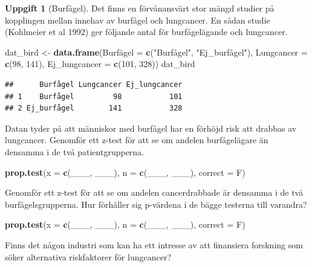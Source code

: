 \documentclass[
]{book}
\newenvironment{Shaded}{\begin{snugshade}}{\end{snugshade}}
\newcommand{\AttributeTok}[1]{\textcolor[rgb]{0.13,0.29,0.53}{#1}}
\newcommand{\DecValTok}[1]{\textcolor[rgb]{0.00,0.00,0.81}{#1}}
\newcommand{\FunctionTok}[1]{\textcolor[rgb]{0.13,0.29,0.53}{\textbf{#1}}}
\newcommand{\NormalTok}[1]{#1}
\newcommand{\OtherTok}[1]{\textcolor[rgb]{0.56,0.35,0.01}{#1}}
\newcommand{\StringTok}[1]{\textcolor[rgb]{0.31,0.60,0.02}{#1}}
\theoremstyle{definition}
\theoremstyle{definition}
\theoremstyle{definition}
\newtheorem{exercise}{Uppgift}[chapter]
\theoremstyle{definition}
\theoremstyle{remark}
\begin{document}
\begin{exercise}[Burfågel]
Det finns en förvånansvärt stor mängd studier på kopplingen mellan innehav av burfågel och lungcancer. En sådan studie (Kohlmeier et al 1992) ger följande antal för burfågelägande och lungcancer.

\begin{Shaded}
\begin{Highlighting}[]
\NormalTok{dat\_bird }\OtherTok{\textless{}{-}} \FunctionTok{data.frame}\NormalTok{(Burfågel }\OtherTok{=} \FunctionTok{c}\NormalTok{(}\StringTok{"Burfågel"}\NormalTok{, }\StringTok{"Ej\_burfågel"}\NormalTok{),}
              \AttributeTok{Lungcancer =} \FunctionTok{c}\NormalTok{(}\DecValTok{98}\NormalTok{, }\DecValTok{141}\NormalTok{),}
              \AttributeTok{Ej\_lungcancer =} \FunctionTok{c}\NormalTok{(}\DecValTok{101}\NormalTok{, }\DecValTok{328}\NormalTok{))}
\NormalTok{dat\_bird}
\end{Highlighting}
\end{Shaded}

\begin{verbatim}
##      Burfågel Lungcancer Ej_lungcancer
## 1    Burfågel         98           101
## 2 Ej_burfågel        141           328
\end{verbatim}

Datan tyder på att människor med burfågel har en förhöjd risk att drabbas av lungcancer. Genomför ett z-test för att se om andelen burfågelägare än densamma i de två patientgrupperna.

\begin{Shaded}
\begin{Highlighting}[]
\FunctionTok{prop.test}\NormalTok{(}\AttributeTok{x =} \FunctionTok{c}\NormalTok{(\_\_\_, \_\_\_), }\AttributeTok{n =} \FunctionTok{c}\NormalTok{(\_\_\_, \_\_\_), }\AttributeTok{correct =}\NormalTok{ F)}
\end{Highlighting}
\end{Shaded}

Genomför ett z-test för att se om andelen cancerdrabbade är densamma i de två burfågelsgrupperna. Hur förhåller sig p-värdena i de bägge testerna till varandra?

\begin{Shaded}
\begin{Highlighting}[]
\FunctionTok{prop.test}\NormalTok{(}\AttributeTok{x =} \FunctionTok{c}\NormalTok{(\_\_\_, \_\_\_), }\AttributeTok{n =} \FunctionTok{c}\NormalTok{(\_\_\_, \_\_\_), }\AttributeTok{correct =}\NormalTok{ F)}
\end{Highlighting}
\end{Shaded}

Finns det någon industri som kan ha ett intresse av att finansiera forskning som söker alternativa riskfaktorer för lungcancer?
\end{exercise}
\end{document}
